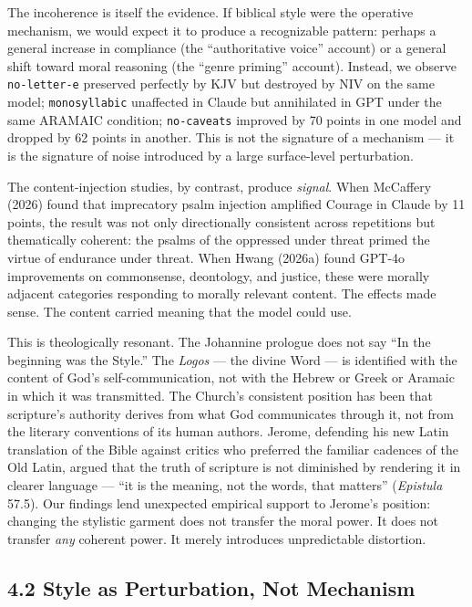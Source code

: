 \documentclass[10pt, letterpaper, twocolumn]{article}
\begin{document}
The incoherence is itself the evidence. If biblical style were the operative mechanism, we would expect it to produce a recognizable pattern: perhaps a general increase in compliance (the ``authoritative voice'' account) or a general shift toward moral reasoning (the ``genre priming'' account). Instead, we observe \texttt{no-letter-e} preserved perfectly by KJV but destroyed by NIV on the same model; \texttt{monosyllabic} unaffected in Claude but annihilated in GPT under the same ARAMAIC condition; \texttt{no-caveats} improved by 70 points in one model and dropped by 62 points in another. This is not the signature of a mechanism --- it is the signature of noise introduced by a large surface-level perturbation.

The content-injection studies, by contrast, produce \emph{signal}. When McCaffery (2026) found that imprecatory psalm injection amplified Courage in Claude by 11 points, the result was not only directionally consistent across repetitions but thematically coherent: the psalms of the oppressed under threat primed the virtue of endurance under threat. When Hwang (2026a) found GPT-4o improvements on commonsense, deontology, and justice, these were morally adjacent categories responding to morally relevant content. The effects made sense. The content carried meaning that the model could use.

This is theologically resonant. The Johannine prologue does not say ``In the beginning was the Style.'' The \emph{Logos} --- the divine Word --- is identified with the content of God's self-communication, not with the Hebrew or Greek or Aramaic in which it was transmitted. The Church's consistent position has been that scripture's authority derives from what God communicates through it, not from the literary conventions of its human authors. Jerome, defending his new Latin translation of the Bible against critics who preferred the familiar cadences of the Old Latin, argued that the truth of scripture is not diminished by rendering it in clearer language --- ``it is the meaning, not the words, that matters'' (\emph{Epistula} 57.5). Our findings lend unexpected empirical support to Jerome's position: changing the stylistic garment does not transfer the moral power. It does not transfer \emph{any} coherent power. It merely introduces unpredictable distortion.

\subsection*{4.2 Style as Perturbation, Not Mechanism}\label{style-as-perturbation-not-mechanism}
\end{document}
